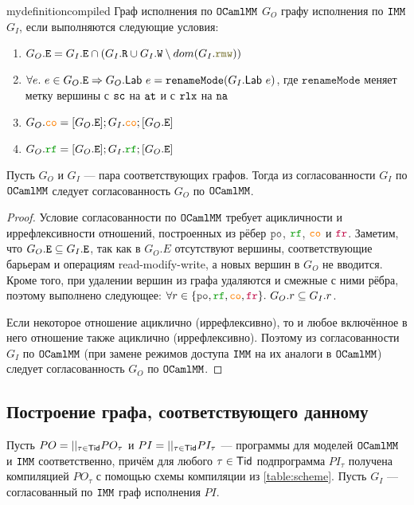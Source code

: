 \begin{restatable}{mydefinition}{compiled}
  Граф исполнения по $\mathtt{OCaml}\allowbreak \mathtt{MM}$ $G_O$  графу исполнения по $\mathtt{IMM}$ $G_I$, если выполняются следующие условия:
  \begin{enumerate}
  \item $G_O.\lE = G_I.\lE \cap (G_I.\lR \cup G_I.\lW \setminus dom(G_I.\lRMW))$
  \item $\forall e.\ e \in G_O.{\mathtt{E}} \Rightarrow G_O.\mathsf{Lab}\ e = \mathtt{renameMode}(G_I.\mathsf{Lab}\ e)$, где $\mathtt{renameMode}$ меняет метку вершины с ${\mathtt{sc}}$ на ${\mathtt{at}}$ и с $\mathtt{rlx}$ на ${\mathtt{na}}$
  \item $G_O.\lCO = [G_O.\lE]; G_I.\lCO; [G_O.\lE]$
  \item $G_O.\lRF = [G_O.\lE]; G_I.\lRF; [G_O.\lE]$
  \end{enumerate}
\end{restatable}

\begin{theorem} \label{graph-replacement}
  Пусть $G_O$ и $G_I$ --- пара соответствующих графов. Тогда из согласованности $G_I$ по $\mathtt{OCaml}\allowbreak \mathtt{MM}$ следует согласованность $G_O$ по $\mathtt{OCaml}\allowbreak \mathtt{MM}$. 
\end{theorem}
\begin{proof}
  Условие согласованности по $\mathtt{OCaml}\allowbreak \mathtt{MM}$ требует ацикличности и иррефлексивности отношений, построенных из рёбер $\lPO$, $\lRF$, $\lCO$ и $\lFR$. Заметим, что $G_O.{\mathtt{E}} \subseteq G_I.{\mathtt{E}}$, так как в $G_O.E$ отсутствуют вершины, соответствующие барьерам и операциям read-modify-write, а новых вершин в $G_O$ не вводится. Кроме того, при удалении вершин из графа удаляются и смежные с ними рёбра, поэтому выполнено следующее: $\forall r \in \set{\lPO, \lRF, \lCO, \lFR}.\ G_O.r \subseteq G_I.r$.

  Если некоторое отношение ациклично (иррефлексивно), то и любое включённое в него отношение также ациклично (иррефлексивно). Поэтому из согласованности $G_I$ по $\mathtt{OCaml}\allowbreak \mathtt{MM}$ (при замене режимов доступа $\mathtt{IMM}$ на их аналоги в $\mathtt{OCaml}\allowbreak \mathtt{MM}$) следует согласованность $G_O$ по $\mathtt{OCaml}\allowbreak \mathtt{MM}$.
\end{proof}

\subsection{Построение графа, соответствующего данному}

Пусть $PO=||_{\tau\in \mathsf{Tid}} PO_\tau$ и $PI=||_{\tau\in \mathsf{Tid}} PI_\tau$ --- программы для моделей $\mathtt{OCaml}\allowbreak \mathtt{MM}$ и $\mathtt{IMM}$ соответственно, причём для любого $\tau \in \mathsf{Tid}$ подпрограмма $PI_\tau$ получена компиляцией $PO_\tau$ с помощью схемы компиляции из \cref{table:scheme}. Пусть $G_I$ --- согласованный по $\mathtt{IMM}$ граф исполнения $PI$.

